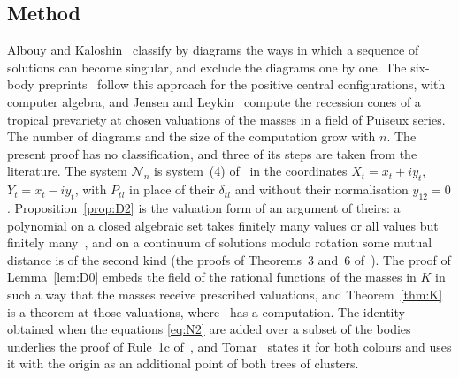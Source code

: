 \documentclass[11pt]{amsart}
\theoremstyle{definition}
\theoremstyle{remark}
\numberwithin{equation}{section}
\newcommand{\cN}{\mathcal{N}}
\begin{document}
\subsection*{Method} Albouy and Kaloshin~\cite{albouykaloshin2012} classify by diagrams the ways in which
a sequence of solutions can become singular, and exclude the diagrams one by one. The six-body
preprints~\cite{tomar6,chentong6} follow this approach for the positive central configurations, with
computer algebra, and Jensen and Leykin~\cite{jensenleykin2025} compute the recession cones of a tropical
prevariety at chosen valuations of the masses in a field of Puiseux series. The number of diagrams and the size of the computation grow with $n$. The
present proof has no classification, and three of its steps are taken from the literature. The
system $\cN_n$ is system~(4) of~\cite[\S 2]{albouykaloshin2012} in the coordinates $X_t = x_t + i y_t$,
$Y_t = x_t - i y_t$, with $P_{tl}$ in place of their $\delta_{tl}$ and without their normalisation
$y_{12} = 0$.
Proposition~\ref{prop:D2} is the valuation form of an argument of theirs: a polynomial on a closed
algebraic set takes finitely many values or all values but finitely
many~\cite[Lemma~1]{albouykaloshin2012}, and on a continuum of solutions modulo rotation some mutual
distance is of the second kind (the proofs of Theorems~3 and~6
of~\cite{albouykaloshin2012}). The proof of Lemma~\ref{lem:D0} embeds the field of the rational functions of the
masses in $K$ in such a way that the masses receive prescribed valuations, and Theorem~\ref{thm:K} is a
theorem at those valuations, where~\cite{jensenleykin2025} has a computation. The identity obtained when the
equations \eqref{eq:N2} are added over a subset of the bodies underlies the proof of Rule~1c
of~\cite[p.~546]{albouykaloshin2012}, and Tomar~\cite[\S 2.3, \S 4.1 and \S 9.1]{tomar6} states it for
both colours and uses it with the origin as an additional point of both trees of clusters.
\end{document}
